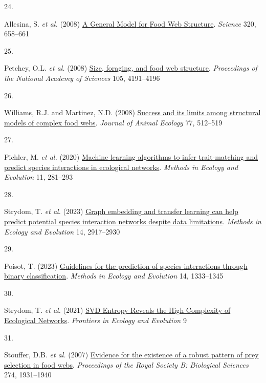 \documentclass[
]{article}
\newlength{\cslhangindent}
\newlength{\csllabelwidth}
\newenvironment{CSLReferences}[2] %
 {\begin{list}{}{%
  \setlength{\itemindent}{0pt}
  \setlength{\leftmargin}{0pt}
  \setlength{\parsep}{0pt}
  \ifodd #1
   \setlength{\leftmargin}{\cslhangindent}
   \setlength{\itemindent}{-1\cslhangindent}
  \fi
  \setlength{\itemsep}{#2\baselineskip}}}
 {\end{list}}
\newcommand{\CSLLeftMargin}[1]{\parbox[t]{\csllabelwidth}{\strut#1\strut}}
\newcommand{\CSLRightInline}[1]{\parbox[t]{\linewidth - \csllabelwidth}{\strut#1\strut}}
\begin{document}
\begin{CSLReferences}{0}{0}
\CSLLeftMargin{24. }%
\CSLRightInline{Allesina, S. \emph{et al.} (2008)
\href{https://doi.org/10.1126/science.1156269}{A {General Model} for
{Food Web Structure}}. \emph{Science} 320, 658--661}

\CSLLeftMargin{25. }%
\CSLRightInline{Petchey, O.L. \emph{et al.} (2008)
\href{https://doi.org/10.1073/pnas.0710672105}{Size, foraging, and food
web structure}. \emph{Proceedings of the National Academy of Sciences}
105, 4191--4196}

\CSLLeftMargin{26. }%
\CSLRightInline{Williams, R.J. and Martinez, N.D. (2008)
\href{https://doi.org/10.1111/j.1365-2656.2008.01362.x}{Success and its
limits among structural models of complex food webs}. \emph{Journal of
Animal Ecology} 77, 512--519}

\CSLLeftMargin{27. }%
\CSLRightInline{Pichler, M. \emph{et al.} (2020)
\href{https://doi.org/10.1111/2041-210X.13329}{Machine learning
algorithms to infer trait-matching and predict species interactions in
ecological networks}. \emph{Methods in Ecology and Evolution} 11,
281--293}

\CSLLeftMargin{28. }%
\CSLRightInline{Strydom, T. \emph{et al.} (2023)
\href{https://doi.org/10.1111/2041-210X.14228}{Graph embedding and
transfer learning can help predict potential species interaction
networks despite data limitations}. \emph{Methods in Ecology and
Evolution} 14, 2917--2930}

\CSLLeftMargin{29. }%
\CSLRightInline{Poisot, T. (2023)
\href{https://doi.org/10.1111/2041-210X.14071}{Guidelines for the
prediction of species interactions through binary classification}.
\emph{Methods in Ecology and Evolution} 14, 1333--1345}

\CSLLeftMargin{30. }%
\CSLRightInline{Strydom, T. \emph{et al.} (2021)
\href{https://doi.org/10.3389/fevo.2021.623141}{{SVD Entropy Reveals}
the {High Complexity} of {Ecological Networks}}. \emph{Frontiers in
Ecology and Evolution} 9}

\CSLLeftMargin{31. }%
\CSLRightInline{Stouffer, D.B. \emph{et al.} (2007)
\href{https://doi.org/10.1098/rspb.2007.0571}{Evidence for the existence
of a robust pattern of prey selection in food webs}. \emph{Proceedings
of the Royal Society B: Biological Sciences} 274, 1931--1940}


\end{CSLReferences}
\end{document}
